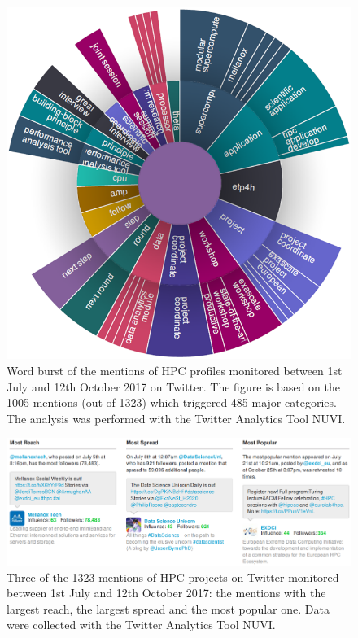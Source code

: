 \begin{figure}[H] 
 \begin{center}
 \includegraphics[scale=0.5]{Images/HPC_word_burst.png}
 \caption{Word burst of the mentions of HPC profiles monitored between 1st July and 12th October 2017 on Twitter. The figure is based on the 1005 mentions (out of 1323) which triggered 485 major categories. The analysis was performed with the Twitter Analytics Tool NUVI.}
 \label{HPC_word_burst}
 \end{center}
\end{figure}

\begin{figure}[!t] 
 \begin{center}
 \includegraphics[scale=0.41]{Images/HPC_Most_reach_spread_popular.png}
 \caption{Three of the 1323 mentions of HPC projects on Twitter monitored between 1st July and 12th October 2017: the mentions with the largest reach, the largest spread and the most popular one. Data were collected with the Twitter Analytics Tool NUVI.}
 \label{HPC_Most_reach_spread_popular}
 \end{center}
\end{figure}

